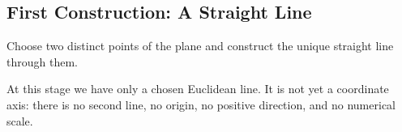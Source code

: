\subsection{First Construction: A Straight Line}

\begin{derivationbox}
Choose two distinct points of the plane and construct the unique straight line
through them.
\end{derivationbox}

\begin{corebox}
At this stage we have only a chosen Euclidean line. It is not yet a coordinate
axis: there is no second line, no origin, no positive direction, and no numerical
scale.
\end{corebox}

\begin{center}
\end{center}
